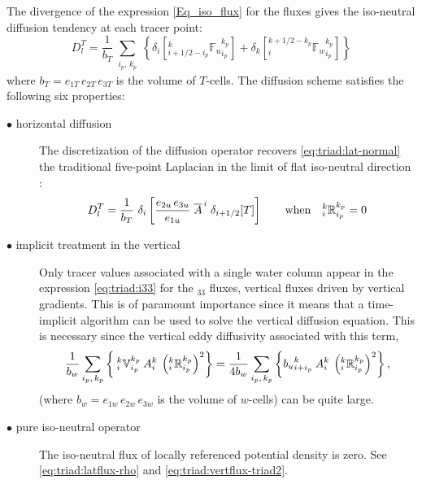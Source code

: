 \documentclass[NEMO_book]{subfiles}
\begin{document}
 The divergence of the expression \eqref{Eq_iso_flux} for the fluxes gives the iso-neutral diffusion tendency at
each tracer point:
\begin{equation} \label{eq:triad:iso_operator} D_l^T = \frac{1}{b_T}
  \sum_{\substack{i_p,\,k_p}} \left\{ \delta_{i} \left[{_{i+1/2-i_p}^k
        {\mathbb{F}_u }_{i_p}^{k_p}} \right] + \delta_{k} \left[
      {_i^{k+1/2-k_p} {\mathbb{F}_w}_{i_p}^{k_p}} \right] \right\}
\end{equation}
where $b_T= e_{1T}\,e_{2T}\,e_{3T}$ is the volume of $T$-cells.
The diffusion scheme satisfies the following six properties:
\begin{description}
\item[$\bullet$ horizontal diffusion] The discretization of the
  diffusion operator recovers \eqref{eq:triad:lat-normal} the traditional five-point Laplacian in
  the limit of flat iso-neutral direction :
  \begin{equation} \label{eq:triad:iso_property0} D_l^T = \frac{1}{b_T} \
    \delta_{i} \left[ \frac{e_{2u}\,e_{3u}}{e_{1u}} \;
      \overline{{A}}^{\,i} \; \delta_{i+1/2}[T] \right] \qquad
    \text{when} \quad { _i^k \mathbb{R}_{i_p}^{k_p} }=0
  \end{equation}

\item[$\bullet$ implicit treatment in the vertical] Only tracer values
  associated with a single water column appear in the expression
  \eqref{eq:triad:i33} for the $_{33}$ fluxes, vertical fluxes driven by
  vertical gradients. This is of paramount importance since it means
  that a time-implicit algorithm can be used to solve the vertical
  diffusion equation. This is necessary
 since the vertical eddy
  diffusivity associated with this term,
  \begin{equation}
    \frac{1}{b_w}\sum_{\substack{i_p, \,k_p}} \left\{
      {\:}_i^k\mathbb{V}_{i_p}^{k_p} \: {A}_i^k \: \left(_i^k \mathbb{R}_{i_p}^{k_p}\right)^2
    \right\}  =
    \frac{1}{4b_w}\sum_{\substack{i_p, \,k_p}} \left\{
      {b_u}_{i+i_p}^k\: {A}_i^k \: \left(_i^k \mathbb{R}_{i_p}^{k_p}\right)^2
    \right\},
 \end{equation}
  (where $b_w= e_{1w}\,e_{2w}\,e_{3w}$ is the volume of $w$-cells) can be quite large.

\item[$\bullet$ pure iso-neutral operator] The iso-neutral flux of
  locally referenced potential density is zero. See
  \eqref{eq:triad:latflux-rho} and \eqref{eq:triad:vertflux-triad2}.


\end{description}
\end{document}
